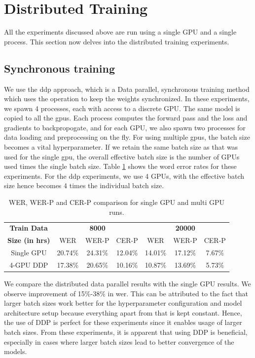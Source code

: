 \section{Distributed Training}
\label{section:res_dist}
All the experiments discussed above are run using a single GPU and a single process. This section now delves into the distributed training experiments. 

\subsection{Synchronous training}
We use the \acrfull{ddp} approach, which is a Data parallel, synchronous training method which uses the  operation to keep the weights synchronized. In these experiments, we spawn 4 processes, each with access to a discrete GPU. The same model is copied to all the \acrshort{gpu}s. Each process computes the forward pass and the loss and gradients to backpropogate, and for each GPU, we also spawn two processes for data loading and preprocessing on the fly. For using multiple \acrshort{gpu}s, the batch size becomes a vital hyperparameter. If we retain the same batch size as that was used for the single \acrshort{gpu}, the overall effective batch size is the number of GPUs used times the single batch size. Table \ref{table:wer_ddp} shows the word error rates for these experiments. For the \acrshort{ddp} experiments, we use 4 GPUs, with the effective batch size hence becomes 4 times the individual batch size. 

\begin{table}[ht]
\centering
\begin{tabular}{c | c c c | c c c }
\hline
\textbf{Train Data} & \multicolumn{3}{c|}{\textbf{8000}} & \multicolumn{3}{c}{\textbf{20000}}\\\cline{2-7}
   \textbf{Size (in hrs)} & WER & WER-P & CER-P & WER & WER-P & CER-P\\
 \hline
  Single GPU & 20.74\% & 24.31\% & 12.04\% & 14.01\% & 17.12\% & 7.67\%\\
  4-GPU DDP & 17.38\% & 20.65\% & 10.16\% & 10.87\% & 13.69\% & 5.73\% \\
 \hline
\end{tabular}
\caption{\label{table:wer_ddp} WER, WER-P and CER-P comparison for single GPU and multi GPU runs.}
\end{table}

We compare the distributed data parallel results with the single GPU results. We observe improvement of 15\%-38\% in \acrshort{wer}. This can be attributed to the fact that larger batch sizes work better for the hyperparameter configuration and model architecture setup because everything apart from that is kept constant. Hence, the use of DDP is perfect for these experiments since it enables usage of larger batch sizes. From these experiments, it is apparent that using DDP is beneficial, especially in cases where larger batch sizes lead to better convergence of the models. 


